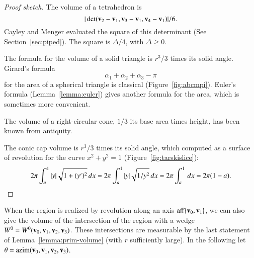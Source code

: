 \begin{proof}[Proof sketch]
The volume of a tetrahedron is
\[ 
|\det({\mathbf v}_2-{\mathbf v}_1,{\mathbf v}_3-{\mathbf v}_1,{\mathbf v}_4-{\mathbf v}_1)|/6.
\] 
Cayley and Menger evaluated the square of this determinant (See
Section~\ref{sec:piped}).  The square is $\Delta/4$, with
$\Delta\ge0$.  
%

The formula for the volume of a solid triangle is $r^3/3$ times
its solid angle.  Girard's formula
\begin{equation} 
\alpha_1+\alpha_2+\alpha_3-\pi\label{eqn:girard}
\end{equation}
for the area of a spherical triangle is classical
(Figure~\ref{fig:abcmpi}).  Euler's formula (Lemma~\ref{lemma:euler})
gives another formula for the area, which is sometimes more
convenient.
%
%
%

\figLWQUMHN %

The volume of a right-circular cone, $1/3$ its base area times height,
has been known from antiquity.  

\figWQBMWZO %

The conic cap volume is $r^3/3$ times its solid angle, which computed
as a surface of revolution for the curve $x^2 + y^2 = 1$
(Figure~\ref{fig:tarskislice}):
\[ 
2\pi \int_a^1  |y| \sqrt{1 + (y')^2}\,dx 
= 2\pi\int_a^1  |y| \sqrt{1/y^2}\,dx 
= 2\pi \int_a^1\,dx = 2\pi (1-a).\qedhere
\]
\end{proof}






%

When the region is realized by revolution along an axis
${\operatorname{aff}}\{{\mathbf v}_0,{\mathbf v}_1\}$, we can also give the volume of the
intersection of the region with a wedge
$W^0=W^0({\mathbf v}_0,{\mathbf v}_1,{\mathbf v}_2,{\mathbf v}_3)$.  These intersections are measurable by
the last statement of Lemma~\ref{lemma:prim-volume} (with $r$
sufficiently large).  In the following let $\theta =
{\operatorname{azim}}({\mathbf v}_0,{\mathbf v}_1,{\mathbf v}_2,{\mathbf v}_3)$.  %
%


